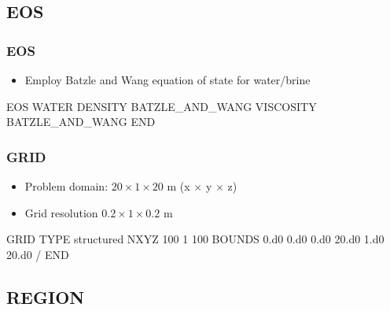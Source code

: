 \documentclass{beamer}
\begin{document}
\subsection{EOS}

\begin{frame}\frametitle{EOS}

\begin{itemize}
\item Employ Batzle and Wang equation of state for water/brine
\end{itemize}

\begin{semiverbatim}

EOS WATER
  DENSITY BATZLE_AND_WANG
  VISCOSITY BATZLE_AND_WANG
END
\end{semiverbatim}

\end{frame}

\begin{frame}\frametitle{GRID}

\begin{itemize}
  \item Problem domain: $20 \times 1 \times 20$ m (x $\times$ y $\times$ z)
  \item Grid resolution $0.2 \times 1 \times 0.2$ m
\end{itemize}

\begin{semiverbatim}
GRID
  TYPE structured 
  NXYZ 100 1 100
  BOUNDS
    0.d0 0.d0 0.d0
    20.d0 1.d0 20.d0 
  /
END
\end{semiverbatim}

\end{frame}

\subsection{REGION}
\end{document}
